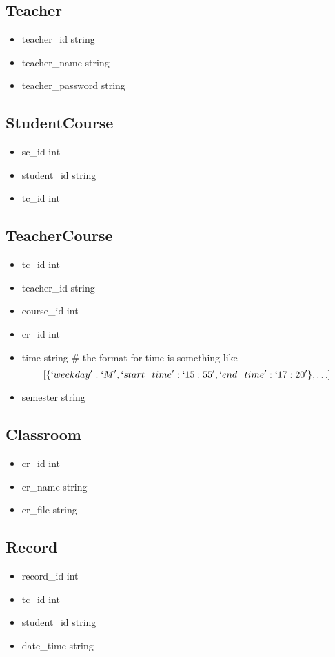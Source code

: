 \documentclass{article}
\begin{document}
\subsection*{Teacher} %
\begin{itemize}
	\item teacher\_id string
	\item teacher\_name string
	\item teacher\_password string
\end{itemize}

\subsection*{StudentCourse} %
\label{sub:studentcourse}
\begin{itemize}
	\item sc\_id int
	\item student\_id string
	\item tc\_id int
\end{itemize}

\subsection*{TeacherCourse} %
\label{sub:teachercourse}
\begin{itemize}
	\item tc\_id int
	\item teacher\_id string
	\item course\_id int
	\item cr\_id int
	\item time string \# the format for time is something like \[[\{`weekday':`M', `start\_time':`15:55', `end\_time':`17:20'\}, \ldots]\]
	\item semester string 
\end{itemize}

\subsection*{Classroom} %
\label{sub:classroom}
\begin{itemize}
	\item cr\_id int
	\item cr\_name string
	\item cr\_file string
\end{itemize}

\subsection*{Record} %
\label{sub:record}
\begin{itemize}
	\item record\_id int
	\item tc\_id int
	\item student\_id string
	\item date\_time string
\end{itemize}
\end{document}
